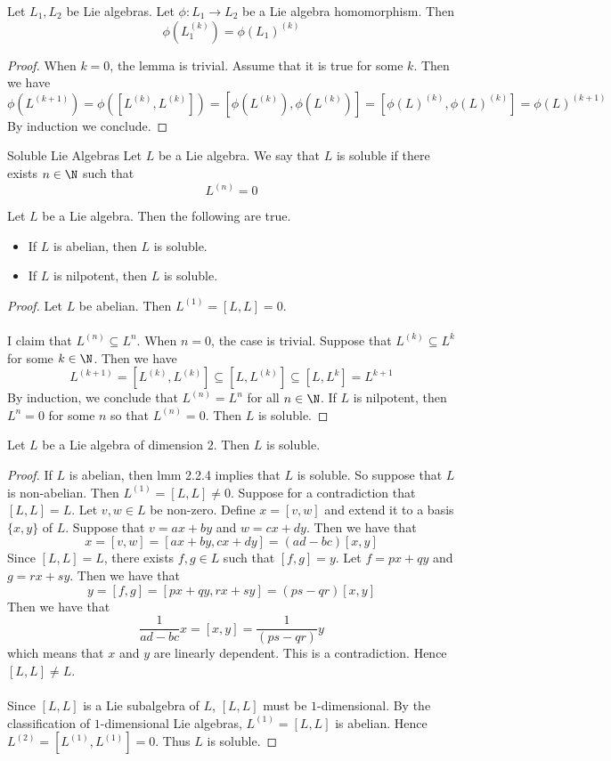 \documentclass[a4paper]{article}
\begin{document}
\begin{lmm}{}{} Let $L_1,L_2$ be Lie algebras. Let $\phi:L_1\to L_2$ be a Lie algebra homomorphism. Then $$\phi(L_1^{(k)})=\phi(L_1)^{(k)}$$ \tcbline
\begin{proof}
When $k=0$, the lemma is trivial. Assume that it is true for some $k$. Then we have $$\phi(L^{(k+1)})=\phi([L^{(k)},L^{(k)}])=[\phi(L^{(k)}),\phi(L^{(k)})]=[\phi(L)^{(k)},\phi(L)^{(k)}]=\phi(L)^{(k+1)}$$ By induction we conclude. 
\end{proof}
\end{lmm}

\begin{defn}{Soluble Lie Algebras}{} Let $L$ be a Lie algebra. We say that $L$ is soluble if there exists $n\in\N$ such that $$L^{(n)}=0$$
\end{defn}

\begin{lmm}{}{} Let $L$ be a Lie algebra. Then the following are true. 
\begin{itemize}
\item If $L$ is abelian, then $L$ is soluble. 
\item If $L$ is nilpotent, then $L$ is soluble. 
\end{itemize} \tcbline
\begin{proof}
Let $L$ be abelian. Then $L^{(1)}=[L,L]=0$. \\~\\

I claim that $L^{(n)}\subseteq L^n$. When $n=0$, the case is trivial. Suppose that $L^{(k)}\subseteq L^k$ for some $k\in\N$. Then we have $$L^{(k+1)}=[L^{(k)},L^{(k)}]\subseteq[L,L^{(k)}]\subseteq[L,L^k]=L^{k+1}$$ By induction, we conclude that $L^{(n)}=L^n$ for all $n\in\N$. If $L$ is nilpotent, then $L^n=0$ for some $n$ so that $L^{(n)}=0$. Then $L$ is soluble. 
\end{proof}
\end{lmm}

\begin{prp}{}{} Let $L$ be a Lie algebra of dimension $2$. Then $L$ is soluble. \tcbline
\begin{proof}
If $L$ is abelian, then lmm 2.2.4 implies that $L$ is soluble. So suppose that $L$ is non-abelian. Then $L^{(1)}=[L,L]\neq 0$. Suppose for a contradiction that $[L,L]=L$. Let $v,w\in L$ be non-zero. Define $x=[v,w]$ and extend it to a basis $\{x,y\}$ of $L$. Suppose that $v=ax+by$ and $w=cx+dy$. Then we have that $$x=[v,w]=[ax+by,cx+dy]=(ad-bc)[x,y]$$ Since $[L,L]=L$, there exists $f,g\in L$ such that $[f,g]=y$. Let $f=px+qy$ and $g=rx+sy$. Then we have that $$y=[f,g]=[px+qy,rx+sy]=(ps-qr)[x,y]$$ Then we have that $$\frac{1}{ad-bc}x=[x,y]=\frac{1}{(ps-qr)}y$$ which means that $x$ and $y$ are linearly dependent. This is a contradiction. Hence $[L,L]\neq L$. \\~\\

Since $[L,L]$ is a Lie subalgebra of $L$, $[L,L]$ must be $1$-dimensional. By the classification of $1$-dimensional Lie algebras, $L^{(1)}=[L,L]$ is abelian. Hence $L^{(2)}=[L^{(1)},L^{(1)}]=0$. Thus $L$ is soluble. 
\end{proof}
\end{prp}
\end{document}
